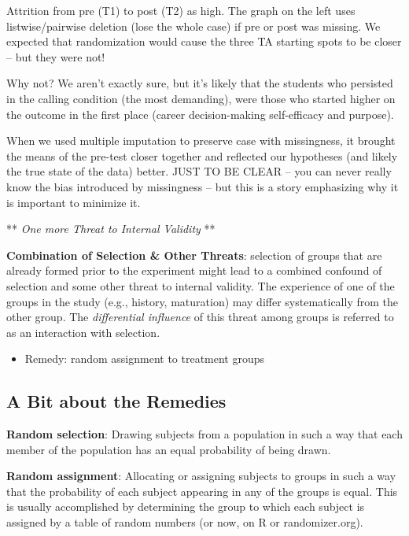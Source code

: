 \documentclass[
  english,
]{book}
\providecommand{\tightlist}{%
  \setlength{\itemsep}{0pt}\setlength{\parskip}{0pt}}
\begin{document}
Attrition from pre (T1) to post (T2) as high. The graph on the left uses listwise/pairwise deletion (lose the whole case) if pre or post was missing. We expected that randomization would cause the three TA starting spots to be closer -- but they were not!

Why not? We aren't exactly sure, but it's likely that the students who persisted in the calling condition (the most demanding), were those who started higher on the outcome in the first place (career decision-making self-efficacy and purpose).

When we used multiple imputation to preserve case with missingness, it brought the means of the pre-test closer together and reflected our hypotheses (and likely the true state of the data) better. JUST TO BE CLEAR -- you can never really know the bias introduced by missingness -- but this is a story emphasizing why it is important to minimize it.

** \emph{One more Threat to Internal Validity} **

\textbf{Combination of Selection \& Other Threats}: selection of groups that are already formed prior to the experiment might lead to a combined confound of selection and some other threat to internal validity. The experience of one of the groups in the study (e.g., history, maturation) may differ systematically from the other group. The \emph{differential influence} of this threat among groups is referred to as an interaction with selection.

\begin{itemize}
\tightlist
\item
  Remedy: random assignment to treatment groups
\end{itemize}

\hypertarget{a-bit-about-the-remedies}{%
\subsection{A Bit about the Remedies}\label{a-bit-about-the-remedies}}

\textbf{Random selection}: Drawing subjects from a population in such a way that each member of the population has an equal probability of being drawn.

\textbf{Random assignment}: Allocating or assigning subjects to groups in such a way that the probability of each subject appearing in any of the groups is equal. This is usually accomplished by determining the group to which each subject is assigned by a table of random numbers (or now, on R or randomizer.org).
\end{document}
